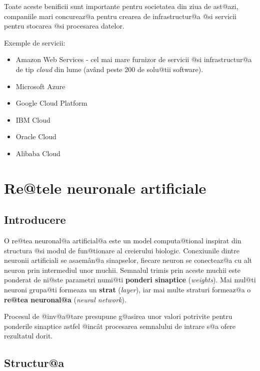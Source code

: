 Toate aceste benificii sunt importante pentru societatea din ziua de ast@azi, companiile mari concureaz@a pentru crearea de infrastructur@a @si servicii pentru stocarea @si procesarea datelor.

Exemple de servicii:

\begin{itemize}
	\item Amazon Web Services - cel mai mare furnizor de servicii @si infrastructur@a de tip \textsl{cloud} din lume (av\^ and peste 200 de solu@tii software).
	\item Microsoft Azure 
	\item Google Cloud Platform
	\item IBM Cloud
	\item Oracle Cloud
	\item Alibaba Cloud
\end{itemize}

	

\chapter{Re@tele neuronale artificiale}


\section{Introducere}


O re@tea neuronal@a artificial@a este un model computa@tional inspirat din structura @si modul de fun@tionare al creierului biologic. Conexiunile dintre neuronii artificiali se asaem\^ an@a sinapselor, fiecare neuron se conecteaz@a cu alt neuron prin intermediul unor muchii. Semnalul trimis prin aceste muchii este ponderat de ni@ste parametri numi@ti \textbf{ponderi sinaptice} (\textsl{weights}). Mai mul@ti neuroni grupa@ti formeaza un \textbf{strat} (\textsl{layer}), iar mai multe straturi formeaz@a o \textbf{re@tea neuronal@a} (\textsl{neural network}).

Procesul de @inv@a@tare presupune g@asirea unor valori potrivite pentru ponderile sinaptice astfel @inc\^ at procesarea semnalului de intrare s@a ofere rezultatul dorit.


\section{Structur@a}

